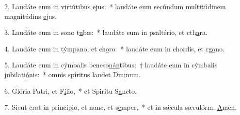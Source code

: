 2. Laudáte eum in virtútibus \uline{e}jus:~* laudáte eum secúndum multitúdinem magnitúdins \uline{e}jus.\par 
3. Laudáte eum in sono t\uline{u}bæ:~* laudáte eum in psaltério, et cth\uline{a}ra.\par 
4. Laudáte eum in týmpano, et ch\uline{o}ro:~* laudáte eum in chordis, et rg\uline{a}no.\par 
5. Laudáte eum in cýmbalis beneso\uline{nán}tibus:~† laudáte eum in cýmbalis jubilati\uline{ó}nis:~* omnis spíritus laudet Dm\uline{i}num.\par 
6. Glória Patri, et F\uline{í}lio,~* et Spirítu S\uline{a}ncto.\par 
7. Sicut erat in princípio, et nunc, et s\uline{e}mper,~* et in sǽcula sæculórm. \uline{A}men.\par 
